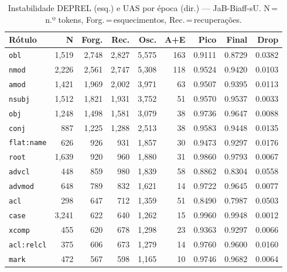 

\begin{table}[ht]
\centering
\caption{Instabilidade DEPREL (esq.) e UAS por época (dir.) --- JaB-Biaff-sU. N\,=\,n.º tokens, Forg.\,=\,esquecimentos, Rec.\,=\,recuperações.}
\label{tab:inst-modernJabuticaBERT-Base-1k-predictions-ablacao-biaffine}
\begin{minipage}[t]{0.54\linewidth}
\centering\tiny
\begin{tabular}{lrrrrrrrr}
\toprule
\textbf{Rótulo} & \textbf{N} & \textbf{Forg.} & \textbf{Rec.} & \textbf{Osc.} & \textbf{A+E} & \textbf{Pico} & \textbf{Final} & \textbf{Drop} \\
\midrule
\texttt{obl} & 1,519 & 2,748 & 2,827 & 5,575 & 163 & 0.9111 & 0.8729 & 0.0382 \\
\texttt{nmod} & 2,226 & 2,561 & 2,747 & 5,308 & 118 & 0.9524 & 0.9420 & 0.0103 \\
\texttt{amod} & 1,421 & 1,969 & 2,002 & 3,971 & 63 & 0.9507 & 0.9395 & 0.0113 \\
\texttt{nsubj} & 1,512 & 1,821 & 1,931 & 3,752 & 51 & 0.9570 & 0.9537 & 0.0033 \\
\texttt{obj} & 1,248 & 1,498 & 1,581 & 3,079 & 38 & 0.9736 & 0.9647 & 0.0088 \\
\texttt{conj} & 887 & 1,225 & 1,288 & 2,513 & 38 & 0.9583 & 0.9448 & 0.0135 \\
\texttt{flat\!:\!name} & 626 & 926 & 931 & 1,857 & 30 & 0.9473 & 0.9297 & 0.0176 \\
\texttt{root} & 1,639 & 920 & 960 & 1,880 & 31 & 0.9860 & 0.9793 & 0.0067 \\
\texttt{advcl} & 448 & 859 & 980 & 1,839 & 58 & 0.8862 & 0.8304 & 0.0558 \\
\texttt{advmod} & 648 & 789 & 832 & 1,621 & 14 & 0.9722 & 0.9645 & 0.0077 \\
\texttt{acl} & 298 & 647 & 712 & 1,359 & 51 & 0.8490 & 0.7987 & 0.0503 \\
\texttt{case} & 3,241 & 622 & 640 & 1,262 & 15 & 0.9960 & 0.9948 & 0.0012 \\
\texttt{xcomp} & 455 & 620 & 678 & 1,298 & 23 & 0.9363 & 0.9297 & 0.0066 \\
\texttt{acl\!:\!relcl} & 375 & 606 & 673 & 1,279 & 14 & 0.9760 & 0.9600 & 0.0160 \\
\texttt{mark} & 472 & 567 & 598 & 1,165 & 10 & 0.9746 & 0.9682 & 0.0064 \\
\bottomrule
\end{tabular}
\end{minipage}

\end{table}
